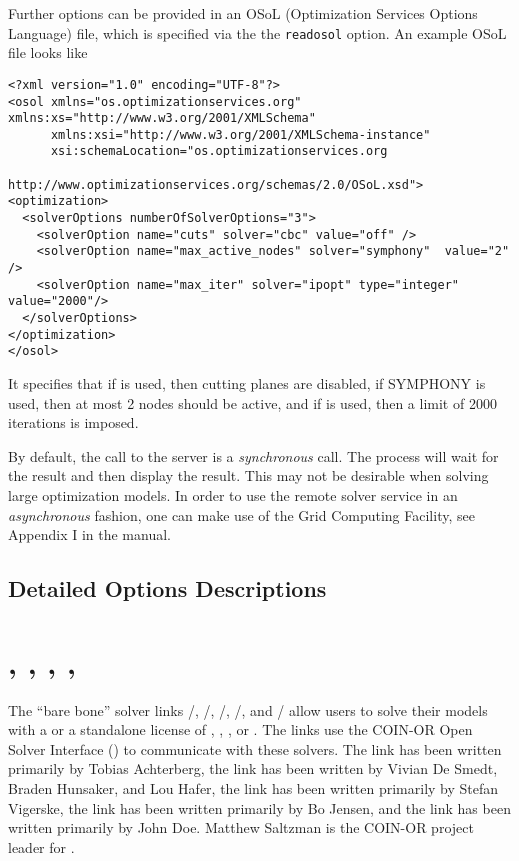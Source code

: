 Further options can be provided in an OSoL (Optimization Services Options Language) file, which is specified via the the \texttt{readosol} option.
An example OSoL file looks like
\begin{verbatim}
<?xml version="1.0" encoding="UTF-8"?>
<osol xmlns="os.optimizationservices.org" xmlns:xs="http://www.w3.org/2001/XMLSchema"
      xmlns:xsi="http://www.w3.org/2001/XMLSchema-instance"
      xsi:schemaLocation="os.optimizationservices.org
                          http://www.optimizationservices.org/schemas/2.0/OSoL.xsd">
<optimization>
  <solverOptions numberOfSolverOptions="3">
    <solverOption name="cuts" solver="cbc" value="off" />
    <solverOption name="max_active_nodes" solver="symphony"  value="2" />
    <solverOption name="max_iter" solver="ipopt" type="integer" value="2000"/>
  </solverOptions>
</optimization>
</osol>
\end{verbatim}
It specifies that if \CBC is used, then cutting planes are disabled,
if \textsc{SYMPHONY} is used, then at most 2 nodes should be active,
and if \IPOPT is used, then a limit of 2000 iterations is imposed.

By default, the call to the server is a \emph{synchronous} call.
The \GAMS process will wait for the result and then display the result.
This may not be desirable when solving large optimization models.
In order to use the remote solver service in an \emph{asynchronous} fashion, one can make use of the \GAMS Grid Computing Facility, see Appendix I in the \GAMS manual.

\subsection{Detailed Options Descriptions}



\section{\OSICPLEX, \OSIGLPK, \OSIGUROBI, \OSIMOSEK, \OSIXPRESS}

The ``bare bone'' solver links \GAMS/\OSICPLEX, \GAMS/\OSIGLPK, \GAMS/\OSIGUROBI, \GAMS/\OSIMOSEK, and \GAMS/\OSIXPRESS
allow users to solve their \GAMS models with a \GLPK or a standalone license of \CPLEX, \GUROBI, \MOSEK, or \XPRESS.
The links use the COIN-OR Open Solver Interface (\OSI) to communicate with these solvers.
The \OSICPLEX link has been written primarily by Tobias Achterberg,
the \OSIGLPK link has been written by Vivian De Smedt, Braden Hunsaker, and Lou Hafer,
the \OSIGUROBI link has been written primarily by Stefan Vigerske,
the \OSIMOSEK link has been written primarily by Bo Jensen, and
the \OSIXPRESS link has been written primarily by John Doe.
Matthew Saltzman is the COIN-OR project leader for \OSI.

